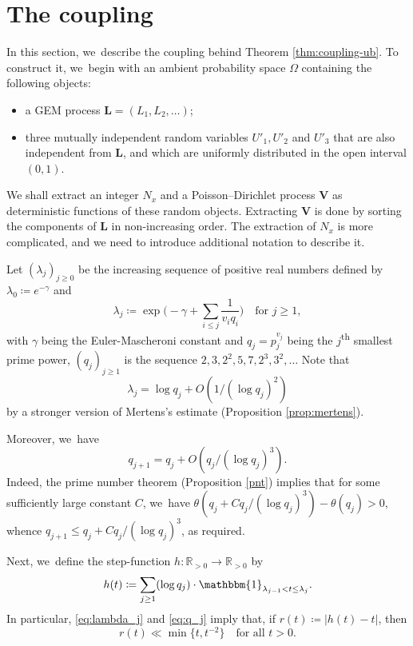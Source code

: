 \documentclass[JEP,XML,SOM,Unicode,published]{cedram}
\newcommand{\bL}{{\boldsymbol L}}
\newcommand{\bV}{{\boldsymbol V}}
\newcommand{\RR}{\mathbb{R}}
\newcommand{\one}{\mathbbm{1}}
\newcommand{\bgg}{\Big}
\theoremstyle{plain}
\theoremstyle{definition}
\begin{document}
\section{The coupling}
\label{sec:coupling}

In this section, we~describe the coupling behind Theorem \ref{thm:coupling-ub}. To construct it, we~begin with an ambient probability space $\Omega$ containing the following objects:
\begin{itemize}
\item a GEM process $\bL = (L_1, L_2, \ldots)$;

\item three mutually independent random variables $U'_1, U'_2$ and $U'_3$ that are also independent from $\bL$, and which are uniformly distributed in the open interval $(0, 1)$.
\end{itemize}
We shall extract an integer $N_x$ and a Poisson--Dirichlet process $\bV$ as deterministic functions of these random objects. Extracting $\bV$ is done by sorting the components of $\bL$ in non-increasing order. The extraction of $N_x$ is more complicated, and we need to introduce additional notation to describe it.

Let $(\lambda_j)_{j \ge 0}$ be the increasing sequence of positive real numbers defined by $\lambda_0 \coloneqq e^{-\gamma}$ and
\[
\lambda_j \coloneqq \exp\!\bgg(\!-\gamma+ \sum_{i \le j} \frac{1}{v_iq_i}\bgg)\quad \text{for $j \ge 1$},
\]
with $\gamma$ being the Euler-Mascheroni constant and $q_j = p_j^{v_j}$ being the $j$\textsuperscript{th} smallest prime power, \ie $(q_j)_{j \ge 1}$ is the sequence $2, 3, 2^2, 5, 7, 2^3, 3^2,\dots$ Note that
\begin{equation}
\label{eq:lambda_j}
\lambda_j = \log q_j +O(1/(\log q_j)^2)
\end{equation}
by a stronger version of Mertens's estimate (Proposition \ref{prop:mertens}).

Moreover, we~have
\begin{equation}
\label{eq:q_j}
q_{j+1} = q_j+O(q_j/(\log q_j)^3).
\end{equation}
Indeed, the prime number theorem (Proposition \ref{pnt}) implies that for some sufficiently large constant $C$, we~have $\theta(q_j+Cq_j/(\log q_j)^3) -\theta(q_j)>0$, whence $q_{j+1}\le q_j+Cq_j/(\log q_j)^3$, as required.

Next, we~define the step-function $h:\RR_{>0} \to \RR_{>0}$ by
\begin{equation}
\label{eq:h(t) dfn}
h(t) \coloneqq \sum_{j \ge 1} (\log q_j) \cdot \one_{\lambda_{j-1} < t \le \lambda_j}.
\end{equation}
In particular, \eqref{eq:lambda_j} and \eqref{eq:q_j} imply that, if $r(t) \coloneqq |h(t) - t|$, then
\begin{equation}
\label{eq:h(t) estimate}
r(t) \ll \min\{t, t^{-2}\} \quad \text{for all $t > 0$.}
\end{equation}
\end{document}
